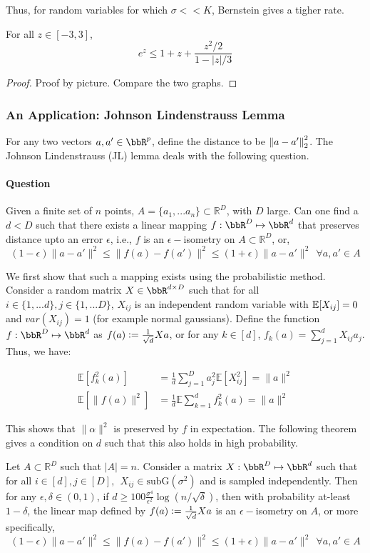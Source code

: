 \documentclass[11pt]{article}
\begin{document}
Thus, for random variables for which $\sigma << K$, Bernstein gives a tigher rate.
\begin{lemma} \label{lem:bernstein_algebraic} For all $z \in [-3, 3] $, 
\[e^z\le 1+z+\frac{z^2/2}{1-|z|/3}\] \end{lemma}
\begin{proof} Proof by picture. Compare the two graphs.
\end{proof}

\subsubsection{An Application: Johnson Lindenstrauss Lemma}
For any two vectors $a, a' \in \bbR^p$, define the distance to be $\nrm*{a - a'}_2^2$. The Johnson Lindenstrauss (JL) lemma deals with the following question.

\paragraph{Question}  Given a finite set of $n$ points, $A=\{a_1, ...a_n\}\subset \mathbb{R}^D$, with $D$ large. Can one find a $d < D$ such that there exists a linear mapping $f: \bbR^D \mapsto \bbR^d$ that preserves distance upto an error $\epsilon$, i.e., $f$ is an $\epsilon-$isometry on $A\subset \mathbb{R}^D$, or,  
$$(1-\epsilon)\|a-a'\|^2\le \|f(a)-f(a')\|^2 \le (1+\epsilon)\|a-a'\|^2 ~~ \forall a, a'\in A$$

We first show that such a mapping exists using the probabilistic method. Consider a random matrix $X \in \bbR^{d \times D}$ such that for all $i\in\{1, ...d\}, j\in \{1, ...D\}$,  $X_{ij}$ is an independent random variable with $\En \brk*{X_{ij}}=0$ and $var(X_{ij})=1$ (for example normal gaussians).  Define the function $f: \bbR^D \mapsto \bbR^d$ as $f(a) \ldef{} \frac{1}{\sqrt{d}}Xa$, or for any $k \in [d]$,  $f_k(a) = \sum_{j=1}^d X_{ij} a_j$. Thus, we have:
 

\begin{align*}\mathbb{E}[f_k^2(a)] &= \frac{1}{d}\sum_{j=1}^D a_j^2 \mathbb{E}[X_{ij}^2] = \|a\|^2 \\
\mathbb{E}[\|f(a)\|^2] &= \frac{1}{d} \mathbb{E}\sum_{k=1}^d f_k^2(a) = \|a\|^2
\end{align*}

This shows that $\|\alpha\|^2$ is preserved by $f$ in expectation. The following theorem gives a condition on $d$ such that this also holds in high probability.

\begin{theorem}[JL lemma]
Let $A\subset \mathbb{R}^D$ such that  $|A|=n$. Consider a matrix $X: \bbR^D \mapsto \bbR^d$ such that for all $i \in [d], j \in [D], ~~ X_{ij} \in  \text{subG}(\sigma^2)$ and is sampled independently. Then for any $\epsilon, \delta\in(0, 1)$, if $d\ge 100 \frac{\sigma^4}{\epsilon^{2}}\log(n/\sqrt{\delta})$, then with probability at-least $1 - \delta$, the linear map defined by $f(a) \ldef{} \frac{1}{\sqrt{d}} Xa$ is an $\epsilon-$isometry on $A$, or more specifically, 
$$(1-\epsilon)\|a-a'\|^2\le \|f(a)-f(a')\|^2 \le (1+\epsilon)\|a-a'\|^2 ~~ \forall a, a'\in A$$
\end{theorem}
\end{document}

